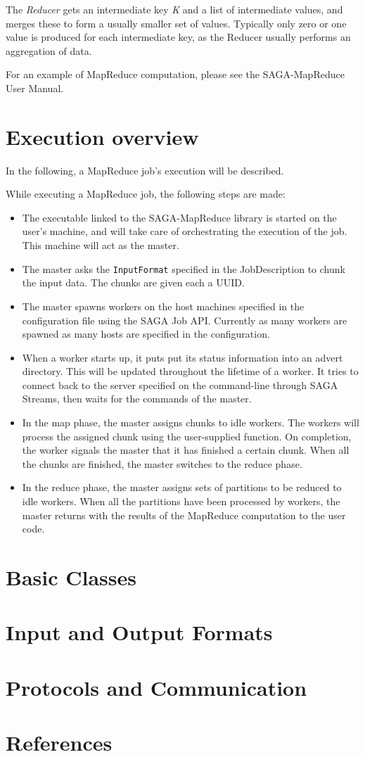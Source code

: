 \documentclass{article}
\begin{document}
The \emph{Reducer} gets an intermediate key \emph{K} and a list of intermediate values, and merges these to form a usually smaller set of values. Typically only zero or one value is produced for each intermediate key, as the Reducer usually performs an aggregation of data.

For an example of MapReduce computation, please see the SAGA-MapReduce User Manual.

\section{Execution overview}

In the following, a MapReduce job's execution will be described.

While executing a MapReduce job, the following steps are made:
\begin{itemize}
  \item The executable linked to the SAGA-MapReduce library is started on the user's machine, and will take care of orchestrating the execution of the job. This machine will act as the master.
  \item The master asks the \texttt{InputFormat} specified in the JobDescription to chunk the input data. The chunks are given each a UUID.
  \item The master spawns workers on the host machines specified in the configuration file using the SAGA Job API. Currently as many workers are spawned as many hosts are specified in the configuration.
  \item When a worker starts up, it puts put its status information into an advert directory. This will be updated throughout the lifetime of a worker. It tries to connect back to the server specified on the command-line through SAGA Streams, then waits for the commands of the master.
  \item In the map phase, the master assigns chunks to idle workers. The workers will process the assigned chunk using the user-supplied function. On completion, the worker signals the master that it has finished a certain chunk. When all the chunks are finished, the master switches to the reduce phase.
  \item In the reduce phase, the master assigns sets of partitions to be reduced to idle workers. When all the partitions have been processed by workers, the master returns with the results of the MapReduce computation to the user code.
\end{itemize}

\section{Basic Classes}

\section{Input and Output Formats}

\section{Protocols and Communication}

\section{References}


\end{document}
